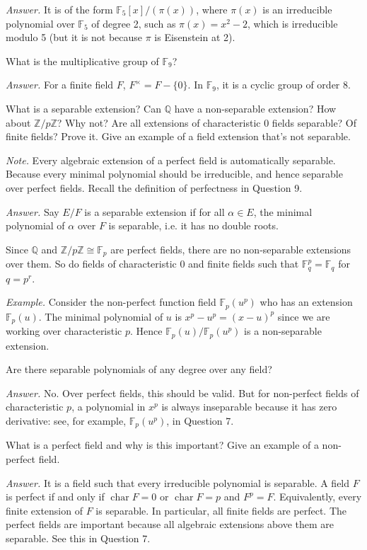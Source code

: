 \documentclass{mathproblems}
\newcommand\F{\mathbb{F}}
\newcommand\Q{\mathbb{Q}}
\newcommand\Z{\mathbb{Z}}
\begin{document}
\begin{questions}
\textit{Answer.}
It is of the form $\F_5[x]/(\pi(x))$, where $\pi(x)$ is an irreducible polynomial over $\F_5$ of degree 2, such as $\pi(x)=x^2-2$, which is irreducible modulo 5 (but it is not because $\pi$ is Eisenstein at 2).

\miquestion
{\color{blue} What is the multiplicative group of $\F_{9}$?}

\textit{Answer.}
For a finite field $F$, $F^\times=F-\{0\}$. In $\F_9$, it is a cyclic group of order $8$.

\miquestion
{\color{blue} What is a separable extension? Can $\Q$ have a non-separable extension? How about $\Z / p \Z$? Why not? Are all extensions of characteristic 0 fields separable? Of finite fields? Prove it. Give an example of a field extension that's not separable.}

{\color{violet} \textit{Note.} Every algebraic extension of a perfect field is automatically separable. Because every minimal polynomial should be irreducible, and hence separable over perfect fields. Recall the definition of perfectness in Question 9.}

\textit{Answer.} Say $E/F$ is a separable extension if for all $\alpha\in E$, the minimal polynomial of $\alpha$ over $F$ is separable, i.e. it has no double roots.

Since $\Q$ and $\Z/p\Z\cong \F_p$ are perfect fields, there are no non-separable extensions over them. So do fields of characteristic 0 and finite fields such that $\F_q^p=\F_q$ for $q=p^r$.

\textit{Example.} Consider the non-perfect function field $\F_p(u^p)$ who has an extension $\F_p(u)$. The minimal polynomial of $u$ is $x^p-u^p=(x-u)^p$ since we are working over characteristic $p$. Hence $\F_p(u)/\F_p(u^p)$ is a non-separable extension.

\miquestion
{\color{blue} Are there separable polynomials of any degree over any field?}

\textit{Answer.} No. Over perfect fields, this should be valid. But for non-perfect fields of characteristic $p$, a polynomial in $x^p$ is always inseparable because it has zero derivative: see, for example, $\F_p(u^p)$, in Question 7.

\miquestion
{\color{blue} What is a perfect field and why is this important? Give an example of a non-perfect field.}

\textit{Answer.}
It is a field such that every irreducible polynomial is separable. A field $F$ is perfect if and only if $\operatorname{char} F=0$ or $\operatorname{char} F=p$ and $F^p=F$. Equivalently, every finite extension of $F$ is separable. In particular, all finite fields are perfect. The perfect fields are important because all algebraic extensions above them are separable. See this in Question 7.


\end{questions}
\end{document}

